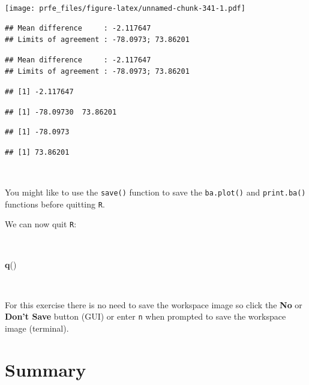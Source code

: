 \documentclass[12pt,a4paper]{book}
\newenvironment{Shaded}{\begin{snugshade}}{\end{snugshade}}
\newcommand{\KeywordTok}[1]{\textcolor[rgb]{0.13,0.29,0.53}{\textbf{#1}}}
\newcommand{\NormalTok}[1]{#1}
\theoremstyle{definition}
\theoremstyle{definition}
\theoremstyle{definition}
\theoremstyle{remark}
\begin{document}
\texttt{[image: prfe\_files/figure-latex/unnamed-chunk-341-1.pdf]}

\begin{verbatim}
## Mean difference     : -2.117647
## Limits of agreement : -78.0973; 73.86201
\end{verbatim}

\begin{verbatim}
## Mean difference     : -2.117647
## Limits of agreement : -78.0973; 73.86201
\end{verbatim}

\begin{verbatim}
## [1] -2.117647
\end{verbatim}

\begin{verbatim}
## [1] -78.09730  73.86201
\end{verbatim}

\begin{verbatim}
## [1] -78.0973
\end{verbatim}

\begin{verbatim}
## [1] 73.86201
\end{verbatim}

~

You might like to use the \texttt{save()} function to save the
\texttt{ba.plot()} and \texttt{print.ba()} functions before quitting
\texttt{R}.

We can now quit \texttt{R}:

~

\begin{Shaded}
\begin{Highlighting}[]
\KeywordTok{q}\NormalTok{()}
\end{Highlighting}
\end{Shaded}

~

For this exercise there is no need to save the workspace image so click
the \textbf{No} or \textbf{Don't Save} button (GUI) or enter \texttt{n}
when prompted to save the workspace image (terminal).

\hypertarget{summary-6}{%
\section{Summary}\label{summary-6}}
\end{document}
